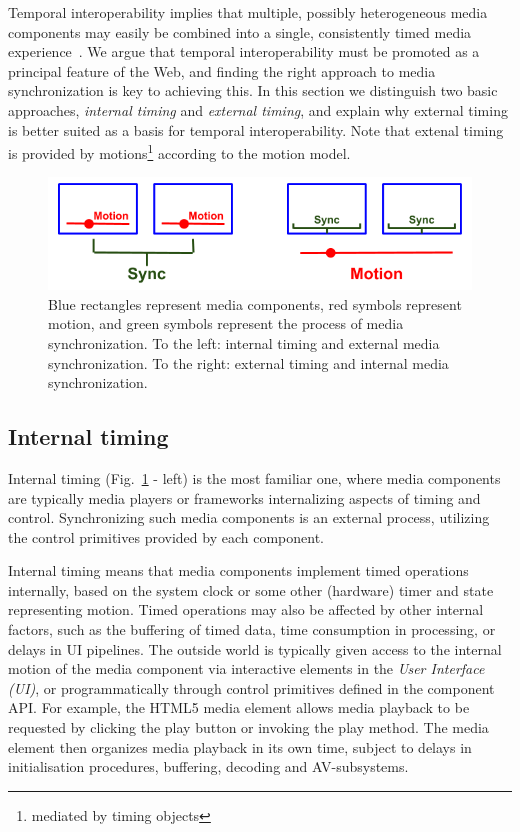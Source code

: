 Temporal interoperability implies that multiple, possibly heterogeneous media
components may easily be combined into a single, consistently timed media
experience~\cite{temporalcomposition}. We argue that temporal interoperability must be promoted as a
principal feature of the Web, and finding the right approach to media
synchronization is key to achieving this. In this section we distinguish two
basic approaches, \emph{internal timing} and \emph{external timing}, and
explain why external timing is better suited as a basis for temporal
interoperability. Note that extenal timing is provided by motions\footnote{mediated by timing objects} 
according to the
motion model.

\begin{figure}[h]
\centering
\includegraphics[scale=.4]{fig/internal-external.png}
\caption{
	Blue rectangles represent media components, red symbols represent motion, and green symbols represent the process of media synchronization. To the left: internal timing and external media synchronization. To the right: external timing and internal media synchronization.
}
\label{fig:internalexternal}
\end{figure}


\subsection{Internal timing}

Internal timing (Fig.~\ref{fig:internalexternal} - left) is the most
familiar one, where media components are typically media players or frameworks
internalizing aspects of timing and control. Synchronizing such media
components is an external process, utilizing the control primitives provided
by each component.

Internal timing means that media components implement timed operations
internally, based on the system clock or some other (hardware) timer and state
representing motion. Timed operations may also be affected by other internal
factors, such as the buffering of timed data, time consumption in processing,
or delays in UI pipelines. The outside world is typically given access to the
internal motion of the media component via interactive elements in the \emph{User Interface (UI)}, or
programmatically through control primitives defined in the component API. For
example, the HTML5 media element allows media playback to be requested by
clicking the play button or invoking the play method. The media element then
organizes media playback in its own time, subject to delays in initialisation
procedures, buffering, decoding and AV-subsystems.

